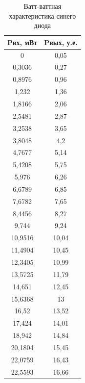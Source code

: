 \documentclass[a4paper,12pt]{article}
\begin{document}
\newpage

\begin{table}[]
	\caption{Ватт-ваттная характеристика синего диода}
	\begin{tabular}{|c|c|}
	\hline
	Pвх, мВт & Pвых, у.е. \\ \hline
	0        & 0,05       \\ \hline
	0,3036   & 0,27       \\ \hline
	0,8976   & 0,96       \\ \hline
	1,232    & 1,36       \\ \hline
	1,8166   & 2,06       \\ \hline
	2,5481   & 2,87       \\ \hline
	3,2538   & 3,65       \\ \hline
	3,8048   & 4,2        \\ \hline
	4,7677   & 5,14       \\ \hline
	5,4208   & 5,75       \\ \hline
	5,976    & 6,26       \\ \hline
	6,6789   & 6,85       \\ \hline
	7,6782   & 7,65       \\ \hline
	8,4456   & 8,27       \\ \hline
	9,744    & 9,24       \\ \hline
	10,9516  & 10,04      \\ \hline
	11,4904  & 10,45      \\ \hline
	12,3405  & 10,99      \\ \hline
	13,5725  & 11,79      \\ \hline
	14,651   & 12,45      \\ \hline
	15,6368  & 13         \\ \hline
	16,52    & 13,52      \\ \hline
	17,424   & 14,01      \\ \hline
	18,942   & 14,84      \\ \hline
	20,1804  & 15,45      \\ \hline
	22,0759  & 16,43      \\ \hline
	22,5593  & 16,66      \\ \hline
	\end{tabular}
	\end{table}
\end{document}
